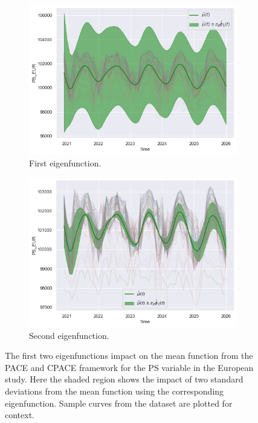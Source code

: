 \begin{figure}
	\centering
	\begin{subfigure}[b]{0.45\textwidth}
		\includegraphics[width=\textwidth]{phi_1_ps_eur}
		\caption{First eigenfunction.}
		\label{fig:phi_1_ps_eur}
	\end{subfigure}
	\hfill        
	\begin{subfigure}[b]{0.45\textwidth}
		\includegraphics[width=\textwidth]{phi_2_ps_eur}
		\caption{Second eigenfunction.}
		\label{fig:phi_2_ps_eur}
	\end{subfigure}
	\caption[The first two eigenfunctions impact on the mean function from the PACE and CPACE framework for the PS variable in the European study.]{The first two eigenfunctions impact on the mean function from the PACE and CPACE framework for the PS variable in the European study. Here the shaded region shows the impact of two standard deviations from the mean function using the corresponding eigenfunction. Sample curves from the dataset are plotted for context.}
	\label{fig:phi_ps_eur}
\end{figure}


